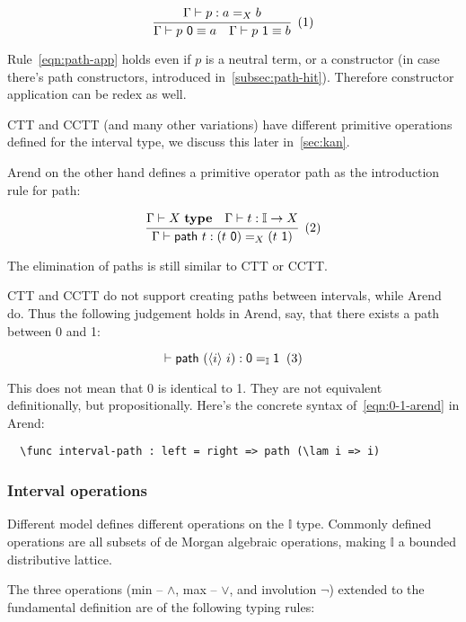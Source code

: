 \[
  \cfrac{
    \Gamma \vdash p : a =_X b
  }{
    \Gamma \vdash p~\textsf 0 \equiv a
    \quad
    \Gamma \vdash p~\textsf 1 \equiv b
  }
  \xtag \label{eqn:path-app}
\]

Rule~\ref{eqn:path-app} holds even if $p$ is a neutral term,
or a constructor (in case there's path constructors,
introduced in~\cref{subsec:path-hit}).
Therefore constructor application can be redex as well.

CTT and CCTT (and many other variations) have different primitive
operations defined for the interval type,
we discuss this later in~\cref{sec:kan}.

Arend on the other hand defines a primitive operator \textsf{path}
as the introduction rule for path:

\[
  \cfrac{
    \Gamma \vdash X~\textbf{type}
    \quad
    \Gamma \vdash t : \mathbb I \rightarrow X
  }{
    \Gamma \vdash \textsf{path}~t : (t~\textsf 0) =_X (t~\textsf 1)
  }
  \xtag
\]

The elimination of paths is still similar to CTT or CCTT.

CTT and CCTT do not support creating paths between intervals,
while Arend do.
Thus the following judgement holds in Arend, say,
that there exists a path between \textsf 0 and \textsf 1:

\[
  \vdash \textsf{path}~(\lrangle i~i) : \textsf 0 =_{\mathbb I} \textsf 1
  \xtag \label{eqn:0-1-arend}
\]

This does not mean that \textsf 0 is identical to \textsf 1.
They are not equivalent definitionally, but propositionally.
Here's the concrete syntax of~\ref{eqn:0-1-arend} in Arend:

\begin{verbatim}
  \func interval-path : left = right => path (\lam i => i)
\end{verbatim}

\subsubsection{Interval operations}

Different model defines different operations on the $\mathbb I$ type.
Commonly defined operations are all subsets of de Morgan algebraic operations,
making $\mathbb I$ a bounded distributive lattice.

The three operations (min -- $\wedge$, max -- $\vee$, and involution $\neg$)
extended to the fundamental definition are of the following typing rules:

